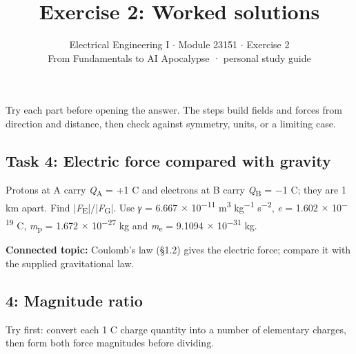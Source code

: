 \documentclass[11pt]{article}
\title{\sffamily\bfseries\color{FAUblue}Exercise 2: Worked solutions}
\author{Electrical Engineering I \ensuremath{\cdot} Module 23151 \ensuremath{\cdot} Exercise 2\\[2pt]\small From Fundamentals to AI Apocalypse · personal study guide}
\date{}
\begin{document}
\maketitle
\begingroup\footnotesize\setlength{\parskip}{0pt}\tableofcontents\endgroup
\clearpage

{\large Try each part before opening the answer. The steps build fields and forces from direction and distance, then check against symmetry, units, or a limiting case.}


\begin{keepsection}
\section{Task 4: Electric force compared with gravity}

Protons at A carry \textit{Q}\textsubscript{A} = +1 C and electrons at B carry \textit{Q}\textsubscript{B} = \ensuremath{-}1 C; they are 1 km apart. Find |\textit{F}\textsubscript{E}|/|\textit{F}\textsubscript{G}|. Use \textit{γ} = 6.667 \ensuremath{\times} 10\textsuperscript{\ensuremath{-}11} m\textsuperscript{3} kg\textsuperscript{\ensuremath{-}1} s\textsuperscript{\ensuremath{-}2}, \textit{e} = 1.602 \ensuremath{\times} 10\textsuperscript{\ensuremath{-}19} C, \textit{m}\textsubscript{p} = 1.672 \ensuremath{\times} 10\textsuperscript{\ensuremath{-}27} kg and \textit{m}\textsubscript{e} = 9.1094 \ensuremath{\times} 10\textsuperscript{\ensuremath{-}31} kg.

\textbf{Connected topic:} Coulomb’s law (§1.2) gives the electric force; compare it with the supplied gravitational law.

\begin{keepsection}
\subsection{4: Magnitude ratio}

Try first: convert each 1 C charge quantity into a number of elementary charges, then form both force magnitudes before dividing.

\end{keepsection}
\end{keepsection}
\end{document}
